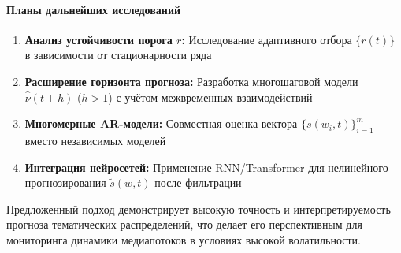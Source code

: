 \documentclass[14pt,a4paper]{article}
\begin{document}
\paragraph{Планы дальнейших исследований}
\begin{enumerate}
    \item \textbf{Анализ устойчивости порога \(r\):} Исследование адаптивного отбора \(\{r(t)\}\) в зависимости от стационарности ряда
    \item \textbf{Расширение горизонта прогноза:} Разработка многошаговой модели \(\widehat{\overline{\nu}}(t+h)\) (\(h > 1\)) с учётом межвременных взаимодействий
    \item \textbf{Многомерные AR-модели:} Совместная оценка вектора \(\{s(w_i,t)\}_{i=1}^m\) вместо независимых моделей
    \item \textbf{Интеграция нейросетей:} Применение RNN/Transformer для нелинейного прогнозирования \(\widetilde{s}(w,t)\) после фильтрации
\end{enumerate}

Предложенный подход демонстрирует высокую точность и интерпретируемость прогноза тематических распределений, что делает его перспективным для мониторинга динамики медиапотоков в условиях высокой волатильности.

\newpage


\end{document}
